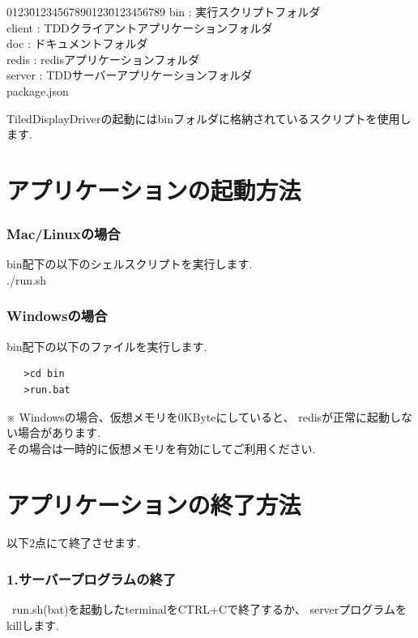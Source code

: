 \documentclass[a4paper,10pt,oneside]{jsbook}
\begin{document}
\begin{tabbing}
0123\=01234567890123\=0123456789\kill
\>bin        \> : 実行スクリプトフォルダ\\
\>client     \> : TDDクライアントアプリケーションフォルダ\\
\>doc        \> : ドキュメントフォルダ\\
\>redis      \> : redisアプリケーションフォルダ\\
\>server     \> : TDDサーバーアプリケーションフォルダ\\
\>package.json
\end{tabbing}

TiledDisplayDriverの起動にはbinフォルダに格納されているスクリプトを使用します.\\



\chapter{アプリケーションの起動方法}


\subsection{Mac/Linuxの場合}
bin配下の以下のシェルスクリプトを実行します.\\
./run.sh



\subsection{Windowsの場合}
bin配下の以下のファイルを実行します.\\
\begin{verbatim}
   >cd bin
   >run.bat
\end{verbatim}


※
Windowsの場合、仮想メモリを0KByteにしていると、
redisが正常に起動しない場合があります.\\
その場合は一時的に仮想メモリを有効にしてご利用ください.\\


\chapter{アプリケーションの終了方法}

以下2点にて終了させます.\\

\subsection{1.サーバープログラムの終了}\
run.sh(bat)を起動したterminalをCTRL+Cで終了するか、
serverプログラムをkillします.\\
\end{document}
